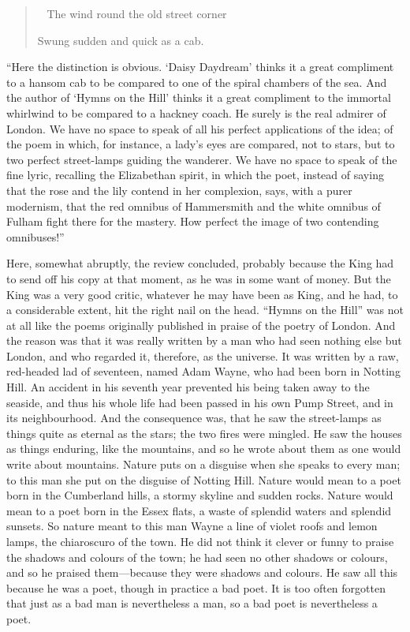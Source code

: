\documentclass{book}
\newenvironment{mdblockquote}{%
  \begin{quotation}
    \
}{%
  \end{quotation}
}
\begin{document}
\begin{mdblockquote}
	The wind round the old street corner

	Swung sudden and quick as a cab.


\end{mdblockquote}
“Here the distinction is obvious. ‘Daisy Daydream’ thinks it a great compliment to a hansom cab to be compared to one of the spiral chambers of the sea. And the author of ‘Hymns on the Hill’ thinks it a great compliment to the immortal whirlwind to be compared to a hackney coach. He surely is the real admirer of London. We have no space to speak of all his perfect applications of the idea; of the poem in which, for instance, a lady’s eyes are compared, not to stars, but to two perfect street-lamps guiding the wanderer. We have no space to speak of the fine lyric, recalling the Elizabethan spirit, in which the poet, instead of saying that the rose and the lily contend in her complexion, says, with a purer modernism, that the red omnibus of Hammersmith and the white omnibus of Fulham fight there for the mastery. How perfect the image of two contending omnibuses!”

Here, somewhat abruptly, the review concluded, probably because the King had to send off his copy at that moment, as he was in some want of money. But the King was a very good critic, whatever he may have been as King, and he had, to a considerable extent, hit the right nail on the head. “Hymns on the Hill” was not at all like the poems originally published in praise of the poetry of London. And the reason was that it was really written by a man who had seen nothing else but London, and who regarded it, therefore, as the universe. It was written by a raw, red-headed lad of seventeen, named Adam Wayne, who had been born in Notting Hill. An accident in his seventh year prevented his being taken away to the seaside, and thus his whole life had been passed in his own Pump Street, and in its neighbourhood. And the consequence was, that he saw the street-lamps as things quite as eternal as the stars; the two fires were mingled. He saw the houses as things enduring, like the mountains, and so he wrote about them as one would write about mountains. Nature puts on a disguise when she speaks to every man; to this man she put on the disguise of Notting Hill. Nature would mean to a poet born in the Cumberland hills, a stormy skyline and sudden rocks. Nature would mean to a poet born in the Essex flats, a waste of splendid waters and splendid sunsets. So nature meant to this man Wayne a line of violet roofs and lemon lamps, the chiaroscuro of the town. He did not think it clever or funny to praise the shadows and colours of the town; he had seen no other shadows or colours, and so he praised them—because they were shadows and colours. He saw all this because he was a poet, though in practice a bad poet. It is too often forgotten that just as a bad man is nevertheless a man, so a bad poet is nevertheless a poet.
\end{document}
